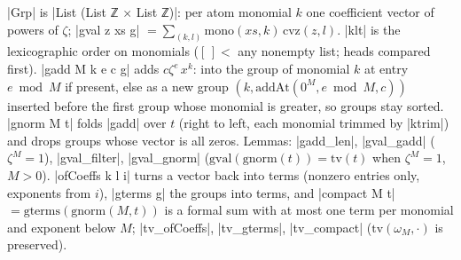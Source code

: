 \begin{definition}[Groups]
\lean|Grp| is \lean|List (List ℤ × List ℤ)|: per atom monomial $k$ one coefficient vector of
powers of $\zeta$; \lean|gval z xs g| $=\sum_{(k,l)}\mathrm{mono}(xs,k)\,\mathrm{cvz}(z,l)$. \lean|klt| is the
lexicographic order on monomials ($[\,]<$ any nonempty list; heads compared first).
\lean|gadd M k e c g| adds $c\zeta^e\,x^k$: into the group of monomial $k$ at entry $e\bmod M$ if
present, else as a new group $(k,\mathrm{addAt}(0^M,e\bmod M,c))$ inserted before the first group whose
monomial is greater, so groups stay sorted. \lean|gnorm M t| folds \lean|gadd| over $t$ (right to
left, each monomial trimmed by \lean|ktrim|) and drops groups whose vector is all zeros. Lemmas:
\lean|gadd_len|, \lean|gval_gadd| ($\zeta^M=1$), \lean|gval_filter|, \lean|gval_gnorm|
($\mathrm{gval}(\mathrm{gnorm}(t))=\mathrm{tv}(t)$ when $\zeta^M=1$, $M>0$).
\lean|ofCoeffs k l i| turns a vector back into terms (nonzero entries only, exponents from $i$),
\lean|gterms g| the groups into terms, and \lean|compact M t| $=\mathrm{gterms}(\mathrm{gnorm}(M,t))$
is a formal sum with at most one term per monomial and exponent below $M$; \lean|tv_ofCoeffs|,
\lean|tv_gterms|, \lean|tv_compact| ($\mathrm{tv}(\omega_M,\cdot)$ is preserved).
\end{definition}

